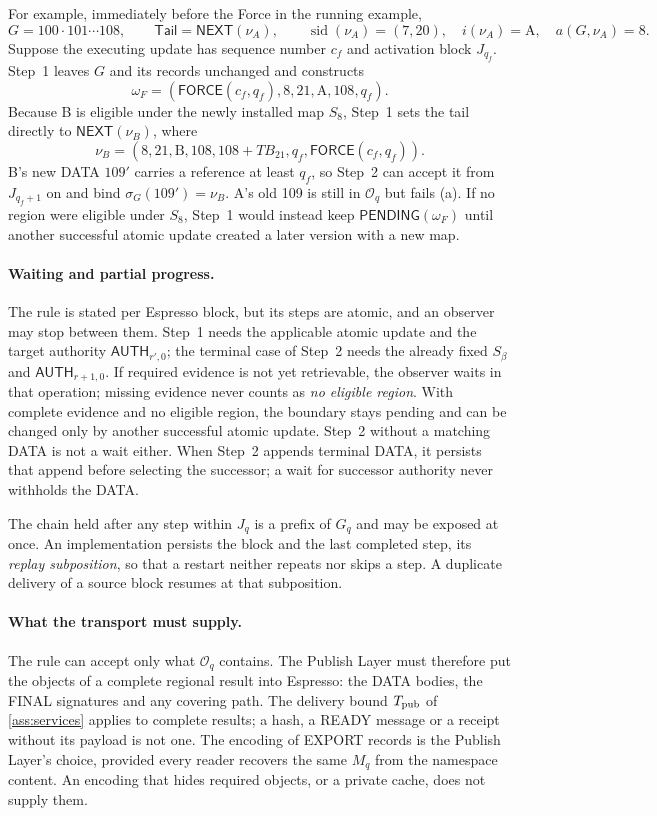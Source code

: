 \documentclass[11pt,a4paper]{article}
\newcommand{\TB}{\mathit{TB}}
\newcommand{\tagg}[1]{\ensuremath{\mathsf{#1}}}
\newcommand{\defterm}[1]{\textcolor{rrBlue}{\textit{#1}}}
\begin{document}
For example, immediately before the Force in the running example,
\[
 G=100\cdot101\cdots108,\qquad
 \mathsf{Tail}=\tagg{NEXT}(\nu_A),\qquad
 \operatorname{sid}(\nu_A)=(7,20),\quad i(\nu_A)=\text{A},\quad
 a(G,\nu_A)=8.
\]
Suppose the executing update has sequence number $c_f$ and activation
block $J_{q_f}$. Step~1 leaves $G$ and its records unchanged and
constructs
\[
 \omega_F=(\tagg{FORCE}(c_f,q_f),8,21,\text{A},108,q_f).
\]
Because B is eligible under the newly installed map $S_8$, Step~1 sets
the tail directly to $\tagg{NEXT}(\nu_B)$, where
\[
 \nu_B=(8,21,\text{B},108,108+\TB_{21},q_f,
        \tagg{FORCE}(c_f,q_f)).
\]
B's new DATA $109'$ carries a reference at least $q_f$, so Step~2 can
accept it from $J_{q_f+1}$ on and bind
$\sigma_G(109')=\nu_B$. A's old 109 is still in $\mathcal O_q$ but
fails (a). If no region were eligible under $S_8$, Step~1 would instead
keep $\tagg{PENDING}(\omega_F)$ until another successful atomic update
created a later version with a new map.

\paragraph{Waiting and partial progress.}
\label{sec:subpositions}
\label{sec:terminal-commit}
The rule is stated per Espresso block, but its steps are atomic, and an
observer may stop between them. Step~1 needs the applicable atomic update
and the target authority $\tagg{AUTH}_{r',0}$; the terminal case of Step~2
needs the already fixed $S_\beta$ and $\tagg{AUTH}_{r+1,0}$. If required
evidence is not yet retrievable, the observer waits in that operation;
missing evidence never counts as \emph{no eligible region}. With complete
evidence and no eligible region, the boundary stays pending and can be
changed only by another successful atomic update. Step~2 without a
matching DATA is not a wait either. When Step~2 appends terminal DATA, it
persists that append before selecting the successor; a wait for successor
authority never withholds the DATA.

The chain held after any step within $J_q$ is a prefix of $G_q$ and may
be exposed at once. An implementation persists the block and the last
completed step, its \defterm{replay subposition}, so that a restart
neither repeats nor skips a step. A duplicate delivery of a source block
resumes at that subposition.

\paragraph{What the transport must supply.}
\label{sec:transport-scope}
The rule can accept only what $\mathcal O_q$ contains. The Publish Layer
must therefore put the objects of a complete regional result into
Espresso: the DATA bodies, the FINAL signatures and any covering path.
The delivery bound $T_{\rm pub}$ of \cref{ass:services} applies to
complete results; a hash, a READY message or a receipt without its
payload is not one. The encoding of EXPORT records is the Publish Layer's
choice, provided every reader recovers the same $M_q$ from the namespace
content. An encoding that hides required objects, or a private cache,
does not supply them.
\end{document}
